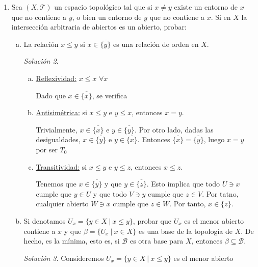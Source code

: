 \documentclass[12pt,twoside]{report}
\newcommand\mc[1]{\mathcal{#1}}
\theoremstyle{azul}
\theoremstyle{azul2}
\theoremstyle{plain}
\theoremstyle{definition}
\theoremstyle{remark}
\newtheorem*{sol}{Solución}
\begin{document}
\begin{enumerate}
\begin{sol}
\begin{itemize}
     $\overline{\left\{\frac{1}{q} \: | \: \:  q \in \mathbb{Z}, \: q \neq 0 \right\}}=\{\nicefrac{1}{q}\} \cup \{0\}$
\end{itemize}
\end{sol}
\item Sea $(X, \mc{T})$ un espacio topológico tal que si $x \neq y$ existe un entorno de $x$ que no contiene a $y$, o bien un entorno de $y$ que no contiene a $x$. Si en $X$ la intersección arbitraria de abiertos es un abierto, probar:
\begin{enumerate}[a)]
    \item La relación $x \leq y$ si $x \in \overline{\{y\}}$ es una relación de orden en $X$.
    \begin{sol}
    \begin{enumerate}[a)]
    \item \underline{Reflexividad:}  $x \leq x$ $\forall x$ 
    
    Dado que $x \in \overline{\{x\}}$, se verifica
        \item \underline{Antisimétrica:} si $x \leq y$ e $y \leq x$, entonces $x=y$.
        
        Trivialmente, $x \in \overline{\{x\}}$ e $y \in \overline{\{y\}}$. Por otro lado, dadas las desigualdades, $x \in \overline{\{y\}}$ e $y \in \overline{\{x\}}$. Entonces $\overline{\{x\}}=\overline{\{y\}}$, luego $x=y$ por ser $T_0$
        \item \underline{Transitividad:} si $x \leq y$ e $y \leq z$, entonces $x \leq z$.
        
        Tenemos que $x \in \overline{\{y\}}$ y que $y \in \overline{\{z\}}$. Esto implica que todo $U \ni x$ cumple que $y \in U$ y que todo $V \ni y$ cumple que $z \in V$. Por tatno, cualquier abierto $W \ni x$ cumple que $z \in W$. Por tanto, $x \in \overline{\{z\}}$.
    \end{enumerate}
    \end{sol}
    \item Si denotamos $U_x=\{y \in X \: | \: x \leq y\}$, probar que $U_x$ es el menor abierto contiene a $x$ y que $\beta=\{U_x \: | \: x \in X\}$ es una base de la topología de $X$. De hecho, es la mínima, esto es, si $\mc{B}$ es otra base para $X$, entonces $\beta \subseteq \mc{B}$.
    \begin{sol}
    Consideremos $U_x=\{y \in X \: | \: x \leq y\}$ es el menor abierto 
    \end{sol}
\end{enumerate}
\end{enumerate}
\end{document}
